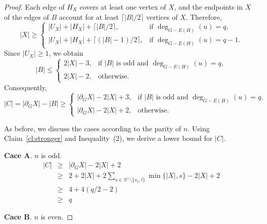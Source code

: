 \documentclass{article}
\begin{document}
\begin{proof}
Each edge of \(H_X\) covers at least one vertex of \(X\), and the endpoints in \(X\) of the edges of \(B\) account for at least \(\lceil |B|/2\rceil\) vertices of \(X\). Therefore,
\[
|X|\ge
\begin{cases}
|U_X|+|H_X|+\lceil |B|/2\rceil, & \text{if } \deg_{G-E(H)}(u)=q,\\[8pt]
|U_X|+|H_X|+\lceil (|B|-1)/2\rceil, & \text{if } \deg_{G-E(H)}(u)=q-1.
\end{cases}
\]
Since \(|U_X|\ge 1\), we obtain
\[
|B|\le
\begin{cases}
2|X|-3, & \text{if } |B| \text{ is odd and } \deg_{G-E(H)}(u)=q,\\[8pt]
2|X|-2, & \text{otherwise}.
\end{cases}
\]
Consequently,
\[
|C|=|\partial_G X|-|B|\ge
\begin{cases}
|\partial_G X|-2|X|+3, & \text{if } |B| \text{ is odd and } \deg_{G-E(H)}(u)=q,\\[8pt]
|\partial_G X|-2|X|+2, & \text{otherwise}.
\end{cases}
\tag{2}
\]

As before, we discuss the cases according to the parity of \(n\). Using Claim~\ref{cl:stronger} and Inequality~(2), we derive a lower bound for \(|C|\).

{\bf Cace A}. $n$ is odd.
\begin{eqnarray*}
|C| &\geq& |\partial_G X|-2|X|+2 \\
&\geq &2+2|X|+2\sum\limits_{s\in S^+\setminus\{s_1,l\}}\min\{|X|,s\}-2|X|+2\\
&\geq &4+4(q/2-2)\\
&\geq &q
\end{eqnarray*}

{\bf Cace B}. $n$ is even.


\end{proof}
\end{document}
